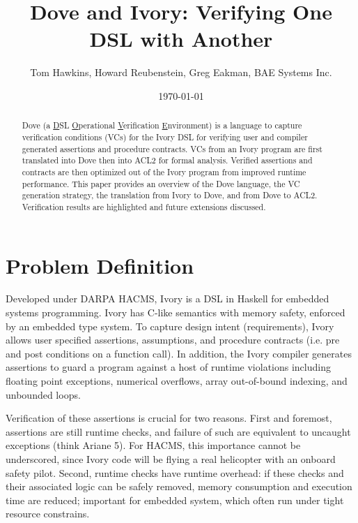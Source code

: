 \documentclass{article}
\begin{document}
\title{Dove and Ivory: Verifying One DSL with Another}
\author{Tom Hawkins, Howard Reubenstein, Greg Eakman, BAE Systems Inc.}
\date{\today}
\maketitle

\begin{abstract}
Dove (a \underline{D}SL \underline{O}perational \underline{V}erification \underline{E}nvironment)
is a language to capture verification conditions (VCs) for the 
Ivory DSL for verifying user and compiler generated assertions
and procedure contracts.  VCs from an Ivory program are first
translated into Dove then into ACL2 for formal analysis.
Verified assertions and contracts are then optimized out of
the Ivory program from improved runtime performance.
This paper provides an overview of the Dove language,
the VC generation strategy, the translation from Ivory to Dove,
and from Dove to ACL2.  Verification results are highlighted
and future extensions discussed.
\end{abstract}


\section{Problem Definition}

Developed under DARPA HACMS, Ivory is a DSL in Haskell for 
embedded systems programming.  Ivory has C-like semantics with memory
safety, enforced by an embedded type system.
To capture design intent (requirements), Ivory allows user specified
assertions, assumptions, and procedure contracts (i.e. pre and post conditions
on a function call).  In addition, the Ivory compiler generates
assertions to guard a program against a host of runtime violations including
floating point exceptions, numerical overflows, array out-of-bound indexing,
and unbounded loops.

Verification of these assertions is crucial for two reasons.  First and foremost,
assertions are still runtime checks, and failure of such are equivalent 
to uncaught exceptions (think Ariane 5).  For HACMS, this importance cannot
be underscored, since Ivory code will be flying a real helicopter with an onboard safety pilot.
Second, runtime checks have
runtime overhead: if these checks and their associated logic can be safely
removed, memory consumption and execution time are reduced; important 
for embedded system, which often run under tight resource constrains.
\end{document}
